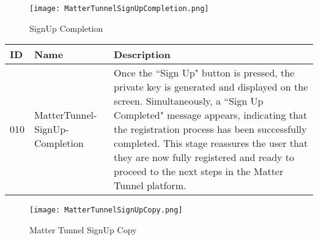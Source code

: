 \documentclass[conference]{IEEEtran}
\begin{document}
\begin{enumerate}[itemsep=2ex, parsep=1ex]
\begin{enumerate}[itemsep=2ex, parsep=1ex]
	      	      \begin{figure}[h!]
	      	      	\centering
	      	      	\texttt{[image: MatterTunnelSignUpCompletion.png]}
	      	      	\caption{SignUp Completion}
	      	      	\label{fig:MatterTunnelSignUpCompletion}
	      	      \end{figure}
	      	                        
	      	      \begin{table}[h!]
	      	      	\def\arraystretch{1.24} \small
	      	      	\begin{tabular}{|p{1.2cm}|p{2.5cm}|p{4.0cm}|}
	      	      		\hline
	      	      		ID  & Name                           & Description                                                                                                                                                                                                                                                                                                                                                               \\
	      	      		\hline
	      	      		010 & MatterTunnel-SignUp-Completion & Once the ``Sign Up" button is pressed, the private key is generated and displayed on the screen. Simultaneously, a ``Sign Up Completed" message appears, indicating that the registration process has been successfully completed. This stage reassures the user that they are now fully registered and ready to proceed to the next steps in the Matter Tunnel platform. \\
	      	      		\hline
	      	      	\end{tabular}
	      	      \end{table}
	      	      
	      	      \begin{figure}[h!]
	      	      	\centering
	      	      	\texttt{[image: MatterTunnelSignUpCopy.png]}
	      	      	\caption{Matter Tunnel SignUp Copy}
	      	      	\label{fig:MatterTunnelSignUpCopy}
	      	      \end{figure}
	      	      	      	      

\end{enumerate}
\end{enumerate}
\end{document}
